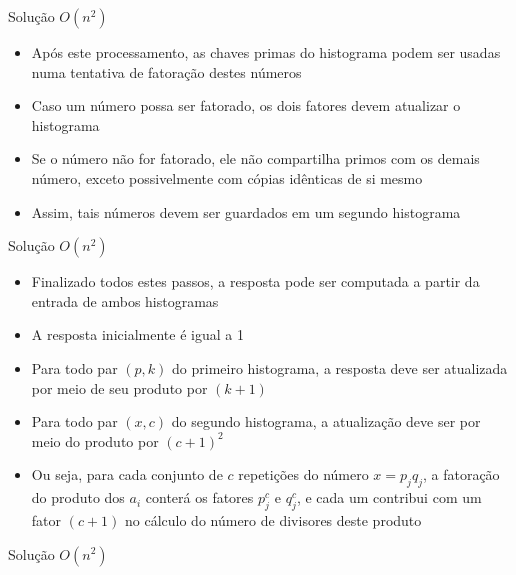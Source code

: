 \begin{frame}[fragile]{Solução $O(n^2)$}

    \begin{itemize}
        \item Após este processamento, as chaves primas do histograma podem ser usadas numa 
            tentativa de fatoração destes números

        \item Caso um número possa ser fatorado, os dois fatores devem atualizar o histograma

        \item Se o número não for fatorado, ele não compartilha primos com os demais número,
            exceto possivelmente com cópias idênticas de si mesmo

        \item Assim, tais números devem ser guardados em um segundo histograma
    \end{itemize}

\end{frame}

\begin{frame}[fragile]{Solução $O(n^2)$}

    \begin{itemize}
        \item Finalizado todos estes passos, a resposta pode ser computada a partir da entrada
            de ambos histogramas

        \item A resposta inicialmente é igual a 1

        \item Para todo par $(p, k)$ do primeiro histograma, a resposta deve ser atualizada
            por meio de seu produto por $(k + 1)$

        \item Para todo par $(x, c)$ do segundo histograma, a atualização deve ser por meio do
            produto por $(c + 1)^2$

        \item Ou seja, para cada conjunto de $c$ repetições do número $x = p_jq_j$, a fatoração
            do produto dos $a_i$ conterá os fatores $p_j^c$ e $q_j^c$, e cada um contribui com
            um fator $(c + 1)$ no cálculo do número de divisores deste produto
    \end{itemize}

\end{frame}
\begin{frame}[fragile]{Solução $O(n^2)$}
\end{frame}

